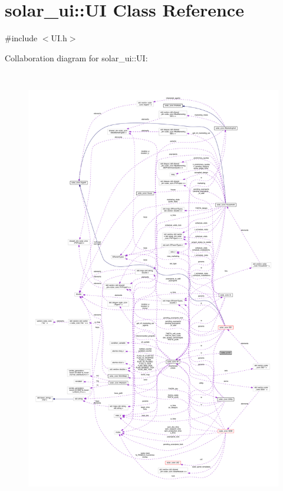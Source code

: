 \hypertarget{classsolar__ui_1_1_u_i}{}\section{solar\+\_\+ui\+:\+:U\+I Class Reference}
\label{classsolar__ui_1_1_u_i}


{\ttfamily \#include $<$U\+I.\+h$>$}



Collaboration diagram for solar\+\_\+ui\+:\+:U\+I\+:
\nopagebreak
\begin{figure}[H]
\begin{center}
\leavevmode
\includegraphics[height=550pt]{classsolar__ui_1_1_u_i__coll__graph}
\end{center}
\end{figure}
